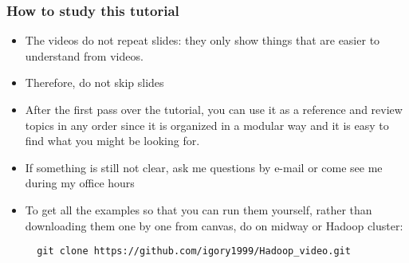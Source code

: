 \documentclass{beamer}
\begin{document}
\begin{frame}[fragile]
  \frametitle{How to study this tutorial}
  \begin{itemize}
  \item The videos do not repeat slides:
    they only show things that are easier to understand from videos.
  \item Therefore, do not skip slides
  \item After the first pass over the tutorial, you can use it as a reference and review topics in any order
    since it is organized in a modular way and it is easy to find what you might be looking for.    
  \item If something is still not clear, ask me questions by e-mail or come see me during my office hours
  \item To get all the examples so that you can run them yourself,
    rather than downloading them one by one from canvas, do on midway or Hadoop cluster:
    {\color{mycolorcli}
\begin{verbatim}
  git clone https://github.com/igory1999/Hadoop_video.git
\end{verbatim}
    }
  \end{itemize}
\end{frame}
\end{document}
